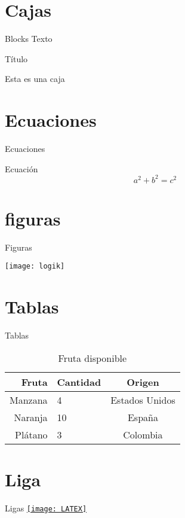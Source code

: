 \documentclass[11pt]{beamer}
\begin{document}
\section{Cajas}

\begin{frame}{Blocks}
Texto
\begin{block}{Título}
\begin{center}
Esta es una caja
\end{center}
\end{block}
\end{frame}

\section{Ecuaciones}

\begin{frame}{Ecuaciones}
\begin{block}{Ecuación}
$$a^2 +b^2 =c^2$$
\end{block}
\end{frame}

\section{figuras}

\begin{frame}{Figuras}
\begin{center}
\texttt{[image: logik]}
\end{center}
\end{frame}

\section{Tablas}
\begin{frame}{Tablas}
\begin{table}[t]
\begin{center}
\begin{tabular}{| r | l | c |}
\hline
Fruta & Cantidad & Origen \\ \hline
Manzana & 4 & Estados Unidos \\
Naranja & 10 & España \\
Plátano & 3 & Colombia \\ \hline
\end{tabular}
\caption{Fruta disponible}
\label{tab:fruta}
\end{center}
\end{table}
\end{frame}


\section{Liga}
\begin{frame}{Ligas}
\href{https://manualdelatex.com/}{\texttt{[image: LATEX]}}
\end{frame}
\end{document}
